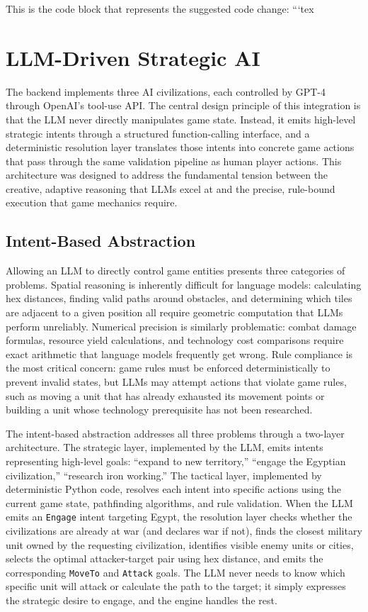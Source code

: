 \documentclass[conference]{IEEEtran}
\begin{document}
This is the code block that represents the suggested code change:
```tex
\section{LLM-Driven Strategic AI}
\label{sec:llm}

The backend implements three AI civilizations, each controlled by GPT-4 through OpenAI's tool-use API. The central design principle of this integration is that the LLM never directly manipulates game state. Instead, it emits high-level strategic intents through a structured function-calling interface, and a deterministic resolution layer translates those intents into concrete game actions that pass through the same validation pipeline as human player actions. This architecture was designed to address the fundamental tension between the creative, adaptive reasoning that LLMs excel at and the precise, rule-bound execution that game mechanics require.

\subsection{Intent-Based Abstraction}

Allowing an LLM to directly control game entities presents three categories of problems. Spatial reasoning is inherently difficult for language models: calculating hex distances, finding valid paths around obstacles, and determining which tiles are adjacent to a given position all require geometric computation that LLMs perform unreliably. Numerical precision is similarly problematic: combat damage formulas, resource yield calculations, and technology cost comparisons require exact arithmetic that language models frequently get wrong. Rule compliance is the most critical concern: game rules must be enforced deterministically to prevent invalid states, but LLMs may attempt actions that violate game rules, such as moving a unit that has already exhausted its movement points or building a unit whose technology prerequisite has not been researched.

The intent-based abstraction addresses all three problems through a two-layer architecture. The strategic layer, implemented by the LLM, emits intents representing high-level goals: ``expand to new territory,'' ``engage the Egyptian civilization,'' ``research iron working.'' The tactical layer, implemented by deterministic Python code, resolves each intent into specific actions using the current game state, pathfinding algorithms, and rule validation. When the LLM emits an \texttt{Engage} intent targeting Egypt, the resolution layer checks whether the civilizations are already at war (and declares war if not), finds the closest military unit owned by the requesting civilization, identifies visible enemy units or cities, selects the optimal attacker-target pair using hex distance, and emits the corresponding \texttt{MoveTo} and \texttt{Attack} goals. The LLM never needs to know which specific unit will attack or calculate the path to the target; it simply expresses the strategic desire to engage, and the engine handles the rest.
\end{document}
